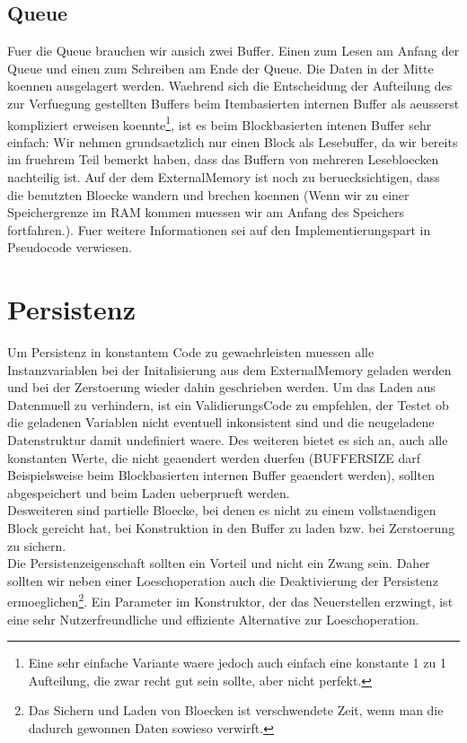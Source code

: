 \documentclass[10pt,a4paper]{article}
\begin{document}
\subsection{Queue}
Fuer die Queue brauchen wir ansich zwei Buffer. Einen zum Lesen am Anfang der Queue und einen zum Schreiben am Ende der Queue. Die Daten in der Mitte koennen ausgelagert werden. Waehrend sich die Entscheidung der Aufteilung des zur Verfuegung gestellten Buffers beim Itembasierten internen Buffer als aeusserst kompliziert erweisen koennte\footnote{Eine sehr einfache Variante waere jedoch auch einfach eine konstante 1 zu 1 Aufteilung, die zwar recht gut sein sollte, aber nicht perfekt.}, ist es beim Blockbasierten intenen Buffer sehr einfach: Wir nehmen grundsaetzlich nur einen Block als Lesebuffer, da wir bereits im fruehrem Teil bemerkt haben, dass das Buffern von mehreren Lesebloecken nachteilig ist. Auf der dem ExternalMemory ist noch zu beruecksichtigen, dass die benutzten Bloecke wandern und brechen koennen (Wenn wir zu einer Speichergrenze im RAM kommen muessen wir am Anfang des Speichers fortfahren.). Fuer weitere Informationen sei auf den Implementierungspart in Pseudocode verwiesen.
\section{Persistenz}
Um Persistenz in konstantem Code zu gewaehrleisten muessen alle Instanzvariablen bei der Initalisierung aus dem ExternalMemory geladen werden und bei der Zerstoerung wieder dahin geschrieben werden. Um das Laden aus Datenmuell zu verhindern, ist ein ValidierungsCode zu empfehlen, der Testet ob die geladenen Variablen nicht eventuell inkonsistent sind und die neugeladene Datenstruktur damit undefiniert waere. Des weiteren bietet es sich an, auch alle konstanten Werte, die nicht geaendert werden duerfen (BUFFERSIZE darf Beispielsweise beim Blockbasierten internen Buffer geaendert werden), sollten abgespeichert und beim Laden ueberprueft werden.\\
Desweiteren sind partielle Bloecke, bei denen es nicht zu einem vollstaendigen Block gereicht hat, bei Konstruktion in den Buffer zu laden bzw. bei Zerstoerung zu sichern. \\
Die Persistenzeigenschaft sollten ein Vorteil und nicht ein Zwang sein. Daher sollten wir neben einer Loeschoperation auch die Deaktivierung der Persistenz ermoeglichen\footnote{Das Sichern und Laden von Bloecken ist verschwendete Zeit, wenn man die dadurch gewonnen Daten sowieso verwirft.}. Ein Parameter im Konstruktor, der das Neuerstellen erzwingt, ist eine sehr Nutzerfreundliche und effiziente Alternative zur Loeschoperation.
\end{document}
